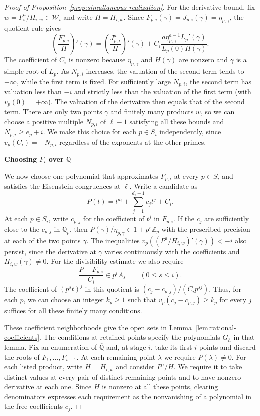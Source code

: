 \documentclass{article}
\newcommand{\proofheading}[1]{%
    \par\addvspace{\smallskipamount}%
    \noindent\textbf{#1}\par\nobreak
}
\theoremstyle{remark}
\begin{document}
\begin{proof}[Proof of Proposition~\ref{prop:simultaneous-realization}]
    For the derivative bound, fix $w = F_i^a/H_{i, w} \in \mathcal{W}_i$ and write $H = H_{i, w}$.
    Since $F_{p, i}(\gamma) = J_{p, i}(\gamma) = \eta_{p, \gamma}$, the quotient rule gives
    \[
        \left(\frac{F_{p, i}^a}{H}\right)'(\gamma)
        = \left(\frac{J_{p, i}^a}{H}\right)'(\gamma)
          + C_i \frac{a \eta_{p, \gamma}^{a - 1} L_p'(\gamma)}{L_p(0) H(\gamma)}.
    \]
    The coefficient of $C_i$ is nonzero because $\eta_{p, \gamma}$ and $H(\gamma)$ are nonzero and $\gamma$ is a simple root of $L_p$.
    As $N_{p, i}$ increases, the valuation of the second term tends to $-\infty$, while the first term is fixed.
    For sufficiently large $N_{p, i}$, the second term has valuation less than $-i$ and strictly less than the valuation of the first term (with $v_p(0) = +\infty$).
    The valuation of the derivative then equals that of the second term.
    There are only two points $\gamma$ and finitely many products $w$, so we can choose a positive multiple $N_{p, i}$ of $\ell - 1$ satisfying all these bounds and $N_{p, i} \ge e_p + i$.
    We make this choice for each $p \in S_i$ independently, since $v_p(C_i) = -N_{p, i}$ regardless of the exponents at the other primes.

    \proofheading{Choosing $F_i$ over $\mathbb{Q}$}
    We now choose one polynomial that approximates $F_{p, i}$ at every $p \in S_i$ and satisfies the Eisenstein congruences at $\ell$.
    Write a candidate as
    \[
        P(t) = t^{d_i} + \sum_{j = 1}^{d_i - 1} c_j t^j + C_i.
    \]
    At each $p \in S_i$, write $c_{p, j}$ for the coefficient of $t^j$ in $F_{p, i}$.
    If the $c_j$ are sufficiently close to the $c_{p, j}$ in $\mathbb{Q}_p$, then $P(\gamma)/\eta_{p, \gamma} \in 1 + p^r\mathbb{Z}_p$ with the prescribed precision at each of the two points $\gamma$.
    The inequalities $v_p((P^a/H_{i, w})'(\gamma)) < -i$ also persist, since the derivative at $\gamma$ varies continuously with the coefficients and $H_{i, w}(\gamma) \ne 0$.
    For the divisibility estimate we also require
    \[
        \frac{P - F_{p, i}}{C_i} \in p^i A_s \qquad (0 \le s \le i).
    \]
    The coefficient of $(p^s t)^j$ in this quotient is $(c_j - c_{p, j})/(C_i p^{s j})$.
    Thus, for each $p$, we can choose an integer $k_p \ge 1$ such that $v_p(c_j - c_{p, j}) \ge k_p$ for every $j$ suffices for all these finitely many conditions.

    These coefficient neighborhoods give the open sets in Lemma~\ref{lem:rational-coefficients}.
    The conditions at retained points specify the polynomials $G_h$ in that lemma.
    Fix an enumeration of $\overline{\mathbb{Q}}$ and, at stage $i$, take its first $i$ points and discard the roots of $F_1, \ldots, F_{i - 1}$.
    At each remaining point $\lambda$ we require $P(\lambda) \ne 0$.
    For each listed product, write $H = H_{i, w}$ and consider $P^a/H$.
    We require it to take distinct values at every pair of distinct remaining points and to have nonzero derivative at each one.
    Since $H$ is nonzero at all these points, clearing denominators expresses each requirement as the nonvanishing of a polynomial in the free coefficients $c_j$.


\end{proof}
\end{document}
